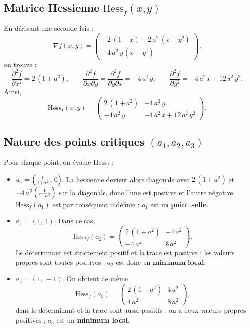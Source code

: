 \documentclass[10pt]{article}
\begin{document}
\subsection{Matrice Hessienne \(\mathrm{Hess}_f(x,y)\)}

En dérivant une seconde fois :
\[
    \nabla f(x,y) 
    = 
    \begin{pmatrix}
    -2\,(1 - x) + 2\,a^2\,(x - y^2) \\
    -4\,a^2\,y\,(x - y^2)
    \end{pmatrix}.
\]
on trouve :
\[
  \frac{\partial^2 f}{\partial x^2} 
  = 2\,(1 + a^2),
  \qquad
  \frac{\partial^2 f}{\partial x \partial y} 
  = \frac{\partial^2 f}{\partial y \partial x} 
  = -4\,a^2\,y,
  \qquad
  \frac{\partial^2 f}{\partial y^2} 
  = -4\,a^2\,x + 12\,a^2\,y^2.
\]
Ainsi,
\[
\mathrm{Hess}_f(x,y)
  = 
  \begin{pmatrix}
    2\,(1 + a^2) & -4\,a^2\,y \\[6pt]
    -4\,a^2\,y   & -4\,a^2\,x + 12\,a^2\,y^2
  \end{pmatrix}.
\]

\subsection{Nature des points critiques \((a_1,a_2,a_3)\)}

Pour chaque point, on évalue \(\mathrm{Hess}_f\) :

\begin{itemize}
\item
  \(\displaystyle a_1 
    = \Bigl(\tfrac{1}{1 + a^2},\,0\Bigr)\).
  La hessienne devient alors diagonale avec 
  \(2\,(1 + a^2)\) et \(\displaystyle -4\,a^2\,\Bigl(\tfrac{1}{1 + a^2}\Bigr)\) 
  sur la diagonale, donc l’une est positive et l’autre négative.
  \(\mathrm{Hess}_f(a_1)\) est par conséquent indéfinie :
  \(a_1\) est un \textbf{point selle}.
\item
  \(\displaystyle a_2 = (1,\,1)\).
  Dans ce cas,
  \[
    \mathrm{Hess}_f(a_2)
    = 
    \begin{pmatrix}
      2\,(1 + a^2) & -4\,a^2 \\
      -4\,a^2      & 8\,a^2
    \end{pmatrix}.
  \]
  Le déterminant est strictement positif et la trace est positive ; les valeurs propres sont toutes positives :
  \(a_2\) est donc un \textbf{minimum local}.
\item
  \(\displaystyle a_3 = (1,\,-1)\).
  On obtient de même
  \[
    \mathrm{Hess}_f(a_3)
    = 
    \begin{pmatrix}
      2\,(1 + a^2) & 4\,a^2 \\
      4\,a^2       & 8\,a^2
    \end{pmatrix},
  \]
  dont le déterminant et la trace sont aussi positifs : on a deux valeurs propres positives ;
  \(a_3\) est un \textbf{minimum local}.
\end{itemize}
\end{document}
